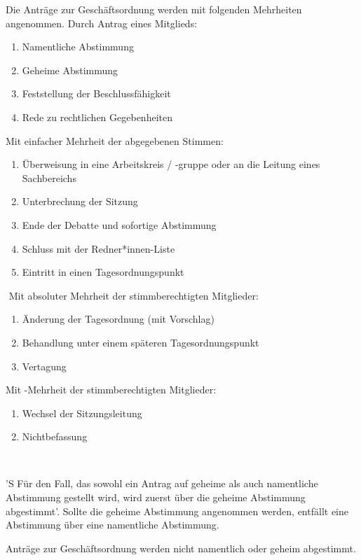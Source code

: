\documentclass[%
    parskip=half,
]{scrartcl}
\newcounter{enumitem}
\begin{document}
\begin{contract}
Die Anträge zur Geschäftsordnung werden mit folgenden Mehrheiten angenommen.
Durch Antrag eines Mitglieds:
\begin{enumerate}[\qquad a)]
    \item Namentliche Abstimmung
    \item Geheime Abstimmung
    \item Feststellung der Beschlussfähigkeit
    \item Rede zu rechtlichen Gegebenheiten
    \setcounter{enumitem}{\value{enumi}}
\end{enumerate}
Mit einfacher Mehrheit der abgegebenen Stimmen:
\begin{enumerate}[\qquad a)]
    \setcounter{enumi}{\value{enumitem}}
    \item Überweisung in eine Arbeitskreis / -gruppe oder an die Leitung eines Sachbereichs
    \item Unterbrechung der Sitzung
    \item Ende der Debatte und sofortige Abstimmung
    \item Schluss mit der Redner*innen-Liste
    \item Eintritt in einen Tagesordnungspunkt
    \setcounter{enumitem}{\value{enumi}}
\end{enumerate}​
Mit absoluter Mehrheit der stimmberechtigten Mitglieder:
\begin{enumerate}[\qquad a)]
    \setcounter{enumi}{\value{enumitem}}
    \item Änderung der Tagesordnung (mit Vorschlag)
    \item Behandlung unter einem späteren Tagesordnungspunkt
    \item Vertagung
    \setcounter{enumitem}{\value{enumi}}
\end{enumerate}
Mit -Mehrheit der stimmberechtigten Mitglieder:
\begin{enumerate}[\qquad a)]
    \setcounter{enumi}{\value{enumitem}}
    \item Wechsel der Sitzungsleitung
    \item Nichtbefassung
\end{enumerate}
\ %

'S Für den Fall, das sowohl ein Antrag auf geheime als auch namentliche Abstimmung gestellt wird, wird zuerst über die geheime Abstimmung abgestimmt'.
Sollte die geheime Abstimmung angenommen werden, entfällt eine Abstimmung über eine namentliche Abstimmung.

Anträge zur Geschäftsordnung werden nicht namentlich oder geheim abgestimmt.


\end{contract}
\end{document}
